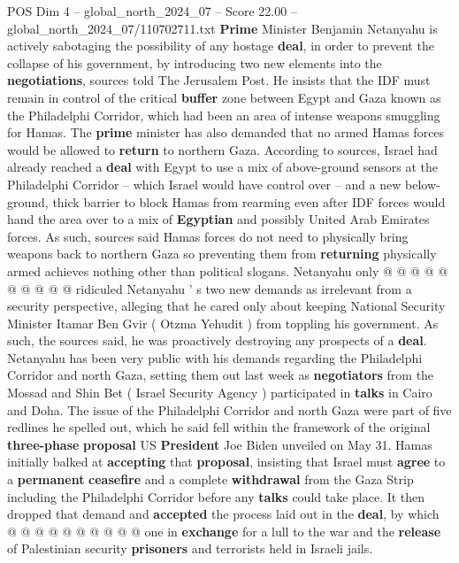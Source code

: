 \begin{textsample}{POS Dim 4 – global\_north\_2024\_07 – Score 22.00 – global\_north\_2024\_07/110702711.txt}  \label{ex:f4_pos_199}
\textbf{Prime} Minister Benjamin Netanyahu is actively sabotaging the possibility of any hostage \textbf{deal}, in order to prevent the collapse of his government, by introducing two new elements into the \textbf{negotiations}, sources told The Jerusalem Post.
He insists that the IDF must remain in control of the critical \textbf{buffer} zone between Egypt and Gaza known as the Philadelphi Corridor, which had been an area of intense weapons smuggling for Hamas.
The \textbf{prime} minister has also demanded that no armed Hamas forces would be allowed to \textbf{return} to northern Gaza.
According to sources, Israel had already reached a \textbf{deal} with Egypt to use a mix of above-ground sensors at the Philadelphi Corridor -- which Israel would have control over -- and a new below-ground, thick barrier to block Hamas from rearming even after IDF forces would hand the area over to a mix of \textbf{Egyptian} and possibly United Arab Emirates forces.
As such, sources said Hamas forces do not need to physically bring weapons back to northern Gaza so preventing them from \textbf{returning} physically armed achieves nothing other than political slogans.
Netanyahu only @ @ @ @ @ @ @ @ @ @ ridiculed Netanyahu ' s two new demands as irrelevant from a security perspective, alleging that he cared only about keeping National Security Minister Itamar Ben Gvir ( Otzma Yehudit ) from toppling his government.
As such, the sources said, he was proactively destroying any prospects of a \textbf{deal}.
Netanyahu has been very public with his demands regarding the Philadelphi Corridor and north Gaza, setting them out last week as \textbf{negotiators} from the Mossad and Shin Bet ( Israel Security Agency ) participated in \textbf{talks} in Cairo and Doha.
The issue of the Philadelphi Corridor and north Gaza were part of five redlines he spelled out, which he said fell within the framework of the original \textbf{three-phase} \textbf{proposal} US \textbf{President} Joe Biden unveiled on May 31.
Hamas initially balked at \textbf{accepting} that \textbf{proposal}, insisting that Israel must \textbf{agree} to a \textbf{permanent} \textbf{ceasefire} and a complete \textbf{withdrawal} from the Gaza Strip including the Philadelphi Corridor before any \textbf{talks} could take place.
It then dropped that demand and \textbf{accepted} the process laid out in the \textbf{deal}, by which @ @ @ @ @ @ @ @ @ @ one in \textbf{exchange} for a lull to the war and the \textbf{release} of Palestinian security \textbf{prisoners} and terrorists held in Israeli jails.

\end{textsample}
